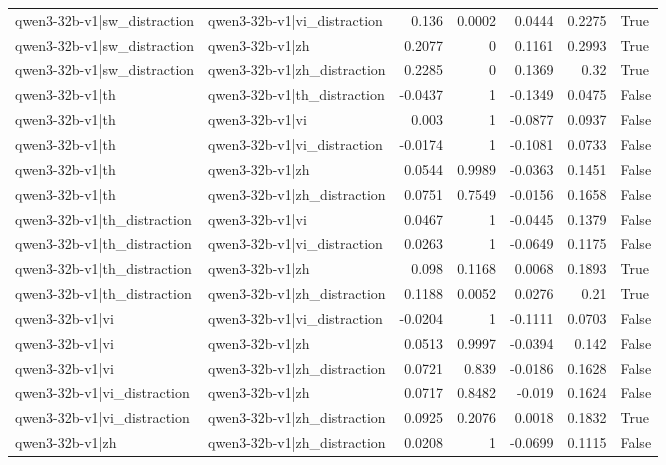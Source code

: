 \begin{table}
\begin{tabular}{l l r r r r l}
qwen3-32b-v1|sw_distraction & qwen3-32b-v1|vi_distraction & 0.136 & 0.0002 & 0.0444 & 0.2275 & True \\
qwen3-32b-v1|sw_distraction & qwen3-32b-v1|zh & 0.2077 & 0 & 0.1161 & 0.2993 & True \\
qwen3-32b-v1|sw_distraction & qwen3-32b-v1|zh_distraction & 0.2285 & 0 & 0.1369 & 0.32 & True \\
qwen3-32b-v1|th & qwen3-32b-v1|th_distraction & -0.0437 & 1 & -0.1349 & 0.0475 & False \\
qwen3-32b-v1|th & qwen3-32b-v1|vi & 0.003 & 1 & -0.0877 & 0.0937 & False \\
qwen3-32b-v1|th & qwen3-32b-v1|vi_distraction & -0.0174 & 1 & -0.1081 & 0.0733 & False \\
qwen3-32b-v1|th & qwen3-32b-v1|zh & 0.0544 & 0.9989 & -0.0363 & 0.1451 & False \\
qwen3-32b-v1|th & qwen3-32b-v1|zh_distraction & 0.0751 & 0.7549 & -0.0156 & 0.1658 & False \\
qwen3-32b-v1|th_distraction & qwen3-32b-v1|vi & 0.0467 & 1 & -0.0445 & 0.1379 & False \\
qwen3-32b-v1|th_distraction & qwen3-32b-v1|vi_distraction & 0.0263 & 1 & -0.0649 & 0.1175 & False \\
qwen3-32b-v1|th_distraction & qwen3-32b-v1|zh & 0.098 & 0.1168 & 0.0068 & 0.1893 & True \\
qwen3-32b-v1|th_distraction & qwen3-32b-v1|zh_distraction & 0.1188 & 0.0052 & 0.0276 & 0.21 & True \\
qwen3-32b-v1|vi & qwen3-32b-v1|vi_distraction & -0.0204 & 1 & -0.1111 & 0.0703 & False \\
qwen3-32b-v1|vi & qwen3-32b-v1|zh & 0.0513 & 0.9997 & -0.0394 & 0.142 & False \\
qwen3-32b-v1|vi & qwen3-32b-v1|zh_distraction & 0.0721 & 0.839 & -0.0186 & 0.1628 & False \\
qwen3-32b-v1|vi_distraction & qwen3-32b-v1|zh & 0.0717 & 0.8482 & -0.019 & 0.1624 & False \\
qwen3-32b-v1|vi_distraction & qwen3-32b-v1|zh_distraction & 0.0925 & 0.2076 & 0.0018 & 0.1832 & True \\
qwen3-32b-v1|zh & qwen3-32b-v1|zh_distraction & 0.0208 & 1 & -0.0699 & 0.1115 & False \\
\bottomrule
\end{tabular}
\end{table}
